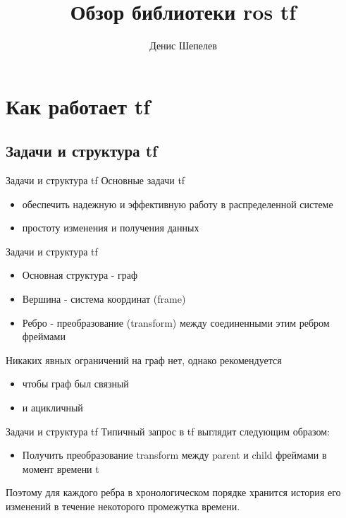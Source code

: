 \documentclass[9pt]{beamer}
\title{Обзор библиотеки ros tf}
\author{Денис Шепелев}
\institute[] %
{
}
\date{ }
\begin{document}
\begin{frame}
  \titlepage
\end{frame}

\section{Как работает tf}

\subsection{Задачи и структура tf}

\begin{frame}{Задачи и структура tf}
  Основные задачи tf
  \begin{itemize}
    \item
    {
      обеспечить надежную и эффективную работу в распределенной системе
    }
    \item
    {
      простоту изменения и получения данных
    }
  \end{itemize}

\end{frame}

\begin{frame}{Задачи и структура tf}
  \begin{itemize}
    \item
    {
      Основная структура - граф
    }
    \item
    {
      Вершина - система координат (frame)
    }
    \item
    {
      Ребро - преобразование (transform) между соединенными этим ребром фреймами
    }
  \end{itemize}

  Никаких явных ограничений на граф нет, однако рекомендуется
  \begin{itemize}
    \item
    {
      чтобы граф был связный
    }
    \item
    {
      и ацикличный
    }
  \end{itemize}

\end{frame}

\begin{frame}{Задачи и структура tf}
Типичный запрос в tf выглядит следующим образом:
\begin{itemize}
    \item
    {
      Получить преобразование transform между parent и child фреймами в момент времени t
    }
  \end{itemize}

Поэтому для каждого ребра в хронологическом порядке хранится история его изменений в течение некоторого промежутка времени. 

\end{frame}
\end{document}
